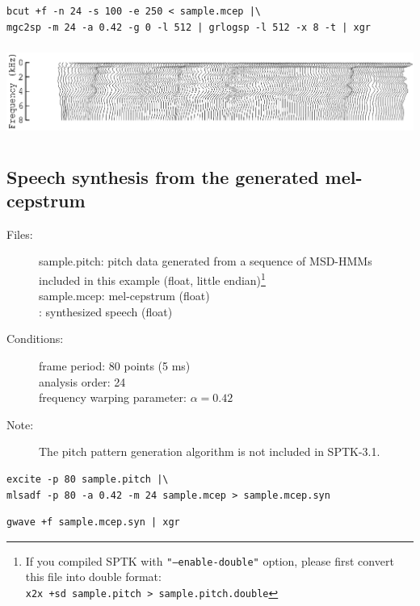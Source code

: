 \documentclass[a4paper,10pt]{article}
\begin{document}
\begin{verbatim}
bcut +f -n 24 -s 100 -e 250 < sample.mcep |\
mgc2sp -m 24 -a 0.42 -g 0 -l 512 | grlogsp -l 512 -x 8 -t | xgr
\end{verbatim}
 
\includegraphics[height=3cm]{eps/sample.mcep.grlogsp-t.eps}

\subsection{Speech synthesis from the generated mel-cepstrum}

\begin{description}
\item[Files:]
  sample.pitch: pitch data generated from a sequence of MSD-HMMs included in this
  example (float, little endian)\footnote{If you compiled SPTK with
\texttt{"--enable-double"} option, please first convert this file into double
format:\\ \texttt{x2x +sd sample.pitch > sample.pitch.double}}\\
  sample.mcep: mel-cepstrum (float) \\
  :
  synthesized speech (float)
\item[Conditions:]
  frame period: 80 points (5 ms)\\
  analysis order: 24\\
  frequency warping parameter: $\alpha = 0.42$
\item[Note:]
  The pitch pattern generation algorithm is not included in SPTK-3.1.
\end{description}

\begin{verbatim}
excite -p 80 sample.pitch |\
mlsadf -p 80 -a 0.42 -m 24 sample.mcep > sample.mcep.syn
\end{verbatim}

\begin{verbatim}
gwave +f sample.mcep.syn | xgr
\end{verbatim}
\end{document}
